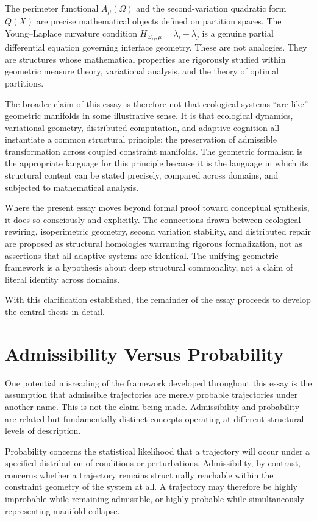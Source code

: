 \documentclass[11pt,a4paper]{article}
\begin{document}
The perimeter functional $A_\mu(\Omega)$ and the second-variation quadratic form $Q(X)$ are precise mathematical objects defined on partition spaces. The Young--Laplace curvature condition $H_{\Sigma_{ij},\mu}=\lambda_i-\lambda_j$ is a genuine partial differential equation governing interface geometry. These are not analogies. They are structures whose mathematical properties are rigorously studied within geometric measure theory, variational analysis, and the theory of optimal partitions.

The broader claim of this essay is therefore not that ecological systems ``are like'' geometric manifolds in some illustrative sense. It is that ecological dynamics, variational geometry, distributed computation, and adaptive cognition all instantiate a common structural principle: the preservation of admissible transformation across coupled constraint manifolds. The geometric formalism is the appropriate language for this principle because it is the language in which its structural content can be stated precisely, compared across domains, and subjected to mathematical analysis.

Where the present essay moves beyond formal proof toward conceptual synthesis, it does so consciously and explicitly. The connections drawn between ecological rewiring, isoperimetric geometry, second variation stability, and distributed repair are proposed as structural homologies warranting rigorous formalization, not as assertions that all adaptive systems are identical. The unifying geometric framework is a hypothesis about deep structural commonality, not a claim of literal identity across domains.

With this clarification established, the remainder of the essay proceeds to develop the central thesis in detail.


\newpage

\section{Admissibility Versus Probability}

One potential misreading of the framework developed throughout this essay is the assumption that admissible trajectories are merely probable trajectories under another name. This is not the claim being made. Admissibility and probability are related but fundamentally distinct concepts operating at different structural levels of description.

Probability concerns the statistical likelihood that a trajectory will occur under a specified distribution of conditions or perturbations. Admissibility, by contrast, concerns whether a trajectory remains structurally reachable within the constraint geometry of the system at all. A trajectory may therefore be highly improbable while remaining admissible, or highly probable while simultaneously representing manifold collapse.
\end{document}

